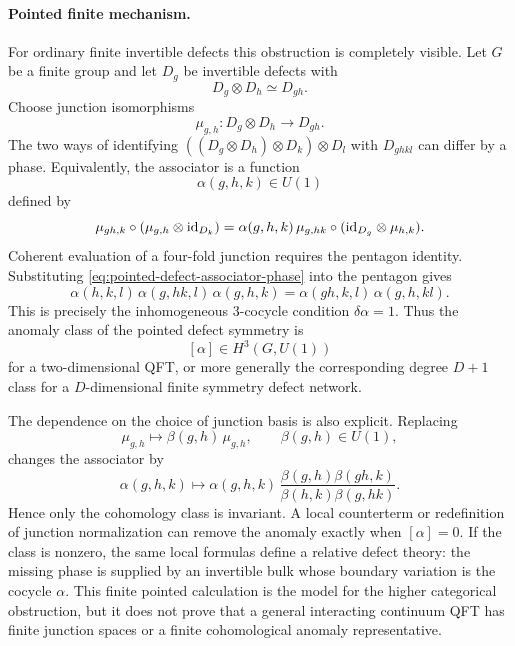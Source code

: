\paragraph{Pointed finite mechanism.}
For ordinary finite invertible defects this obstruction is completely
visible.  Let \(G\) be a finite group and let \(D_g\) be invertible defects
with
\[
  D_g\otimes D_h\simeq D_{gh}.
\]
Choose junction isomorphisms
\[
  \mu_{g,h}:D_g\otimes D_h\to D_{gh}.
\]
The two ways of identifying
\(((D_g\otimes D_h)\otimes D_k)\otimes D_l\) with \(D_{ghkl}\) can differ by
a phase.  Equivalently, the associator is a function
\[
  \alpha(g,h,k)\in U(1)
\]
defined by
\begin{equation}
  \mu_{gh,k}\circ(\mu_{g,h}\otimes{\rm id}_{D_k})
  =
  \alpha(g,h,k)\,
  \mu_{g,hk}\circ({\rm id}_{D_g}\otimes\mu_{h,k}).
  \label{eq:pointed-defect-associator-phase}
\end{equation}
Coherent evaluation of a four-fold junction requires the pentagon identity.
Substituting \eqref{eq:pointed-defect-associator-phase} into the pentagon
gives
\begin{equation}
  \alpha(h,k,l)\,\alpha(g,hk,l)\,\alpha(g,h,k)
  =
  \alpha(gh,k,l)\,\alpha(g,h,kl).
  \label{eq:pointed-defect-3-cocycle}
\end{equation}
This is precisely the inhomogeneous \(3\)-cocycle condition
\(\delta\alpha=1\).  Thus the anomaly class of the pointed defect symmetry is
\[
  [\alpha]\in H^3(G,U(1))
\]
for a two-dimensional QFT, or more generally the corresponding degree
\(D+1\) class for a \(D\)-dimensional finite symmetry defect network.

The dependence on the choice of junction basis is also explicit.  Replacing
\[
  \mu_{g,h}\longmapsto \beta(g,h)\,\mu_{g,h},
  \qquad \beta(g,h)\in U(1),
\]
changes the associator by
\begin{equation}
  \alpha(g,h,k)\longmapsto
  \alpha(g,h,k)\,
  \frac{\beta(g,h)\beta(gh,k)}
       {\beta(h,k)\beta(g,hk)} .
  \label{eq:pointed-defect-associator-coboundary}
\end{equation}
Hence only the cohomology class is invariant.  A local counterterm or
redefinition of junction normalization can remove the anomaly exactly when
\([\alpha]=0\).  If the class is nonzero, the same local formulas define a
relative defect theory: the missing phase is supplied by an invertible bulk
whose boundary variation is the cocycle \(\alpha\).  This finite pointed
calculation is the model for the higher categorical obstruction, but it does
not prove that a general interacting continuum QFT has finite junction spaces
or a finite cohomological anomaly representative.

